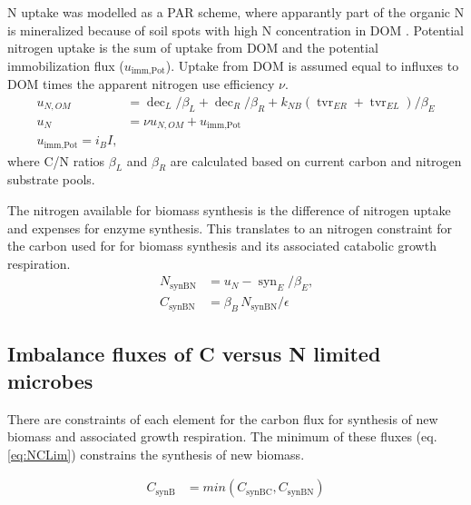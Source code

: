 N uptake was modelled as a PAR scheme, where apparantly part of the organic N is
mineralized because of soil spots with high N concentration in DOM
\citep{Manzoni08}. Potential nitrogen uptake is the sum of uptake from DOM and
the potential immobilization flux ($u_{\operatorname{imm,Pot}}$). Uptake from
DOM is assumed equal to influxes to DOM times the apparent nitrogen use 
efficiency $\nu$.
\begin{subequations}
\label{eq:uN}
\begin{align}
u_{N,OM} &= \operatorname{dec}_L/\beta_L + \operatorname{dec}_R/\beta_R +
k_{NB} (\operatorname{tvr}_{ER} + \operatorname{tvr}_{EL})/\beta_E
\\
u_N &= \nu u_{N,OM} + u_{\operatorname{imm,Pot}}
\\
u_{\operatorname{imm,Pot}} = i_B I 
\text{,}
\end{align}
\end{subequations}
where C/N ratios $\beta_L$ and $\beta_R$ are calculated based on current carbon
and nitrogen substrate pools.  

The nitrogen available for biomass synthesis is the difference of nitrogen
uptake and expenses for enzyme synthesis. This translates to an nitrogen
constraint for the carbon used for for biomass synthesis and its associated
catabolic growth respiration.
\begin{subequations}
\label{eq:synBN}
\begin{align}
N_{\operatorname{synBN}} &= u_N - \operatorname{syn}_E/\beta_E \text{,} \\
C_{\operatorname{synBN}} &= \beta_B \, N_{\operatorname{synBN}}  / \epsilon
\end{align}
\end{subequations}


\subsection{Imbalance fluxes of C versus N limited microbes }
There are constraints of each element for the carbon flux for synthesis of new
biomass and associated growth respiration. The minimum of these fluxes (eq.
\ref{eq:NCLim}) constrains the synthesis of new biomass. 

\begin{subequations}
\label{eq:synB}
\begin{align}
\label{eq:NCLim} C_{\operatorname{synB}} &=
min(C_{\operatorname{synBC}}, C_{\operatorname{synBN}} )
\end{align}
\end{subequations}

